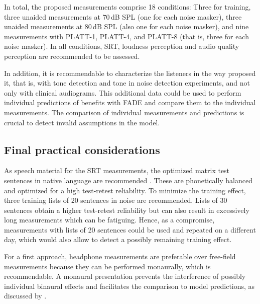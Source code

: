 \documentclass[10pt,a4paper,twocolumn]{article}
\begin{document}
In total, the proposed measurements comprise 18 conditions:
%
Three for training, three unaided measurements at 70\,dB SPL (one for each noise masker), three unaided measurements at 80\,dB SPL (also one for each noise masker), and nine measurements with PLATT-1, PLATT-4, and PLATT-8 (that is, three for each noise masker).
%
In all conditions, SRT, loudness perception and audio quality perception are recommended to be assessed.

In addition, it is recommendable to characterize the listeners in the way \cite{schaedler2020a} proposed it, that is, with tone detection and tone in noise detection experiments, and not only with clinical audiograms.
%
This additional data could be used to perform individual predictions of benefits with FADE and compare them to the individual measurements.
%
The comparison of individual measurements and predictions is crucial to 
detect invalid assumptions in the model.

\subsection*{Final practical considerations}
%
As speech material for the SRT measurements, the optimized matrix test sentences in native language are recommended \citep{kollmeier2015}.
%
These are phonetically balanced and optimized for a high test-retest reliability.
%
To minimize the training effect, three training lists of 20 sentences in noise are recommended.
%
Lists of 30 sentences obtain a higher test-retest reliability but can also result in excessively long measurements which can be fatiguing.
%
Hence, as a compromise, measurements with lists of 20 sentences could be used and repeated on a different day, which would also allow to detect a possibly remaining training effect.

For a first approach, headphone measurements are preferable over free-field measurements because they can be performed monaurally, which is recommendable.
%
A monaural presentation prevents the interference of possibly individual binaural effects and facilitates the comparison to model predictions, as discussed by \cite{schaedler2020a}.
\end{document}
